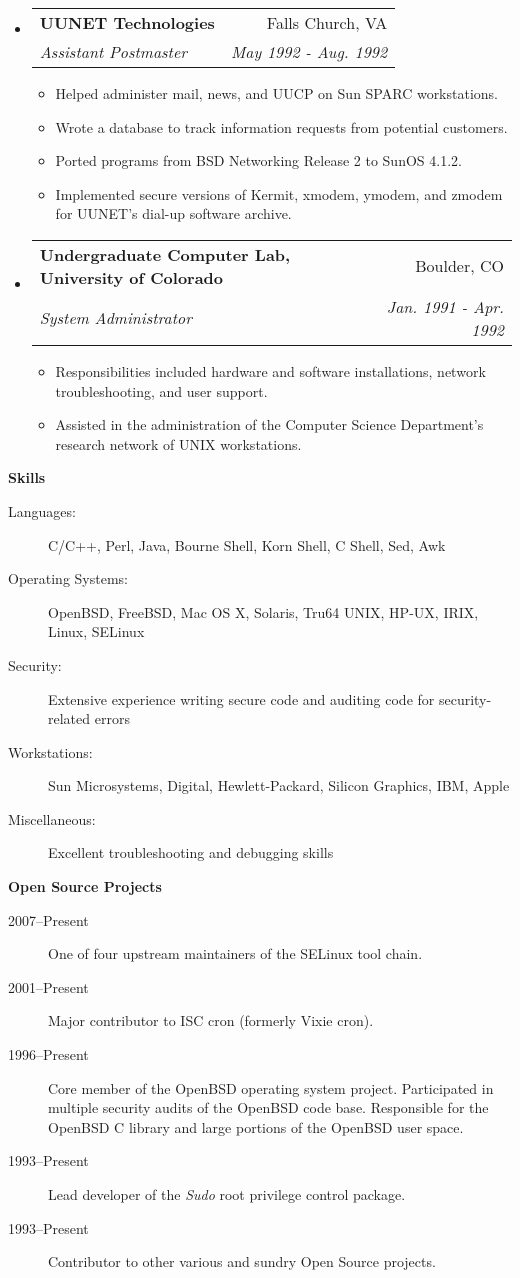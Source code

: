 \documentclass[letterpaper,11pt]{article}
\makeatletter
\newcommand{\resitem}[1]{\item #1 \vspace{-2pt}}
\newcommand{\resheading}[1]{{\large \colorbox{mygrey}{\begin{minipage}{\textwidth}{\textbf{#1 \vphantom{p\^{E}}}}\end{minipage}}}}
\newcommand{\ressubheading}[4]{
\begin{tabular*}{7.0in}{l@{\extracolsep{\fill}}r}
		\textbf{#1} & #2 \\
		\textit{#3} & \textit{#4} \\
\end{tabular*}\vspace{-6pt}}
\makeatother
\begin{document}
\begin{itemize}
\item
	\ressubheading{{\sc \bf UUNET} Technologies}{Falls Church, VA}{Assistant Postmaster}{May 1992 - Aug. 1992}
	\begin{itemize}
		\resitem{Helped administer mail, news, and {\sc UUCP} on Sun SPARC workstations.}
		\resitem{Wrote a database to track information requests from potential customers.}
		\resitem{Ported programs from BSD Networking Release 2 to SunOS 4.1.2.}
		\resitem{Implemented secure versions of Kermit, xmodem, ymodem, and zmodem for {\sc UUNET}'s dial-up software archive.}
	\end{itemize}

\item
	\ressubheading{Undergraduate Computer Lab, University of Colorado}{Boulder, CO}{System Administrator}{Jan. 1991 - Apr. 1992}
	\begin{itemize}
		\resitem{Responsibilities included hardware and software installations, network troubleshooting, and user support.}
		\resitem{Assisted in the administration of the Computer Science Department's research network of {\sc UNIX} workstations.}
	\end{itemize}

\end{itemize}

\pagebreak

\resheading{Skills}

\begin{description}
\item[Languages:]
C/C++, Perl, Java, Bourne Shell, Korn Shell, C Shell, Sed, Awk
\item[Operating Systems:]
OpenBSD, FreeBSD, Mac OS X, Solaris, Tru64 {\sc UNIX}, {\sc HP-UX}, {\sc IRIX}, Linux, SELinux
\item[Security:]
Extensive experience writing secure code and auditing code for security-related errors
\item[Workstations:]
Sun Microsystems, Digital, Hewlett-Packard, Silicon Graphics, {\sc IBM}, Apple
\item[Miscellaneous:]
Excellent troubleshooting and debugging skills
\end{description}

\resheading{Open Source Projects}

\begin{description}
\item[2007--Present] One of four upstream maintainers of the SELinux tool chain.
\item[2001--Present] Major contributor to ISC cron (formerly Vixie cron).
\item[1996--Present] Core member of the OpenBSD operating system project.  Participated in multiple security audits of the OpenBSD code base.  Responsible for the OpenBSD C library and large portions of the OpenBSD user space.
\item[1993--Present] Lead developer of the \emph{Sudo} root privilege control package.
\item[1993--Present] Contributor to other various and sundry Open Source projects.
\end{description}
\end{document}
